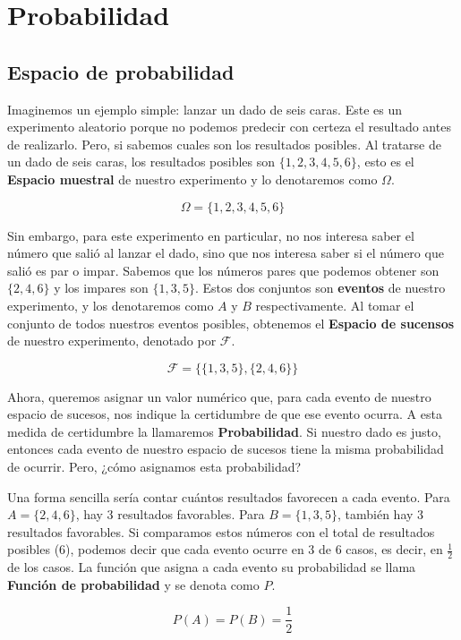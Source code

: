 \section{Probabilidad}

\subsection{Espacio de probabilidad}

Imaginemos un ejemplo simple: lanzar un dado de seis caras. Este es un experimento aleatorio porque
 no podemos predecir con certeza el resultado antes de realizarlo. Pero, si sabemos cuales son los resultados posibles.
 Al tratarse de un dado de seis caras, los resultados posibles son $\{1, 2, 3, 4, 5, 6\}$, esto es el \textbf{Espacio muestral}
 de nuestro experimento y lo denotaremos como $\Omega$.

$$
\Omega = \{1, 2, 3, 4, 5, 6\}
$$

Sin embargo, para este experimento en particular, no nos interesa saber el número que salió al lanzar el dado, sino que nos interesa
saber si el número que salió es par o impar. Sabemos que los números pares que podemos obtener son $\{2, 4, 6\}$ y los impares son $\{1, 3, 5\}$.
Estos dos conjuntos son \textbf{eventos} de nuestro experimento, y los denotaremos como $A$ y $B$ respectivamente. Al tomar el conjunto de
todos nuestros eventos posibles, obtenemos el \textbf{Espacio de sucensos} de nuestro experimento, denotado por $\mathcal{F}$.

$$
\mathcal{F} = \{\{1, 3, 5\}, \{2, 4, 6\}\}
$$

Ahora, queremos asignar un valor numérico que, para cada evento de nuestro espacio de sucesos, nos indique la certidumbre de que
ese evento ocurra. A esta medida de certidumbre la llamaremos \textbf{Probabilidad}. Si nuestro dado es justo, entonces
cada evento de nuestro espacio de sucesos tiene la misma probabilidad de ocurrir. Pero, ¿cómo asignamos esta probabilidad?

Una forma sencilla sería contar cuántos resultados favorecen a cada evento. Para $A=\{2,4,6\}$, hay 3 resultados favorables.
Para $B=\{1,3,5\}$, también hay 3 resultados favorables. Si comparamos estos números con el total de resultados posibles ($6$), podemos decir
que cada evento ocurre en $3$ de $6$ casos, es decir, en $\frac{1}{2}$ de los casos. La función que asigna a cada evento su probabilidad
se llama \textbf{Función de probabilidad} y se denota como $P$.

$$
P(A) = P(B) = \frac{1}{2}
$$

